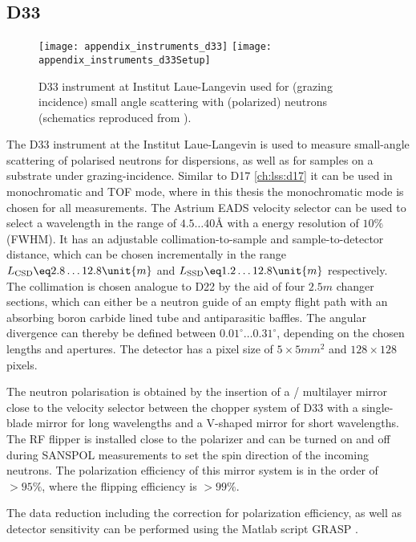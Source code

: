 \documentclass[\main/dresen_thesis.tex]{subfiles}
\begin{document}
  \subsection{D33}\label{ch:lss:d33}
    \begin{figure}[ht]
      \centering
      \texttt{[image: appendix\_instruments\_d33]}
      \texttt{[image: appendix\_instruments\_d33Setup]}
      \caption{\label{fig:lss:d33}D33 instrument at Institut Laue-Langevin used for (grazing incidence) small angle scattering with (polarized) neutrons (schematics reproduced from \cite{Dewhurst_2015_Thesm}).}
    \end{figure}
    The D33 instrument \cite{Dewhurst_2015_Thesm} at the Institut Laue-Langevin is used to measure small-angle scattering of polarised neutrons for dispersions, as well as for samples on a substrate under grazing-incidence.
    Similar to D17 \ref{ch:lss:d17} it can be used in monochromatic and TOF mode, where in this thesis the monochromatic mode is chosen for all measurements.
    The Astrium EADS velocity selector can be used to select a wavelength in the range of $4.5 \ldots 40 \unit{\angstrom}$ with a energy resolution of $10 \unit{\%}$ (FWHM).
    It has an adjustable collimation-to-sample and sample-to-detector distance, which can be chosen incrementally in the range $L_\mathrm{CSD} \eq 2.8 \ldots 12.8 \unit{m}$ and $L_\mathrm{SSD} \eq 1.2 \ldots 12.8 \unit{m}$ respectively.
    The collimation is chosen analogue to D22 by the aid of four $2.5 \unit{m}$ changer sections, which can either be a neutron guide of an empty flight path with an absorbing boron carbide lined tube and antiparasitic baffles.
    The angular divergence can thereby be defined between $0.01^\circ \ldots 0.31^\circ$, depending on the chosen lengths and apertures.
    The detector has a pixel size of $5 \times 5 \unit{mm^2}$ and $128 \times 128$ pixels.

    The neutron polarisation is obtained by the insertion of a / multilayer mirror close to the velocity selector between the chopper system of D33 with a single-blade mirror for long wavelengths and a V-shaped mirror for short wavelengths.
    The RF flipper is installed close to the polarizer and can be turned on and off during SANSPOL measurements to set the spin direction of the incoming neutrons.
    The polarization efficiency of this mirror system is in the order of $>95 \unit{\%}$, where the flipping efficiency is $>99 \unit{\%}$.

    The data reduction including the correction for polarization efficiency, as well as detector sensitivity can be performed using the Matlab script GRASP \cite{Dewhurst_2003_Grasp}.
\end{document}
